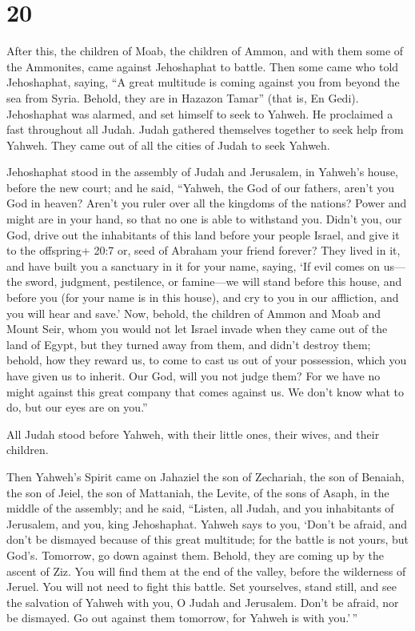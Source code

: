 \hypertarget{section-19}{%
\section{20}\label{section-19}}

 After this, the children of Moab, the children of Ammon,
and with them some of the Ammonites, came against Jehoshaphat to battle.
 Then some came who told Jehoshaphat, saying, ``A great
multitude is coming against you from beyond the sea from Syria. Behold,
they are in Hazazon Tamar'' (that is, En Gedi).  Jehoshaphat
was alarmed, and set himself to seek to Yahweh. He proclaimed a fast
throughout all Judah.  Judah gathered themselves together to
seek help from Yahweh. They came out of all the cities of Judah to seek
Yahweh.

 Jehoshaphat stood in the assembly of Judah and Jerusalem,
in Yahweh's house, before the new court;  and he said,
``Yahweh, the God of our fathers, aren't you God in heaven? Aren't you
ruler over all the kingdoms of the nations? Power and might are in your
hand, so that no one is able to withstand you.  Didn't you,
our God, drive out the inhabitants of this land before your people
Israel, and give it to the offspring+ 20:7 or, seed of Abraham your
friend forever?  They lived in it, and have built you a
sanctuary in it for your name, saying,  `If evil comes on
us---the sword, judgment, pestilence, or famine---we will stand before
this house, and before you (for your name is in this house), and cry to
you in our affliction, and you will hear and save.'  Now,
behold, the children of Ammon and Moab and Mount Seir, whom you would
not let Israel invade when they came out of the land of Egypt, but they
turned away from them, and didn't destroy them;  behold,
how they reward us, to come to cast us out of your possession, which you
have given us to inherit.  Our God, will you not judge
them? For we have no might against this great company that comes against
us. We don't know what to do, but our eyes are on you.''

 All Judah stood before Yahweh, with their little ones,
their wives, and their children.

 Then Yahweh's Spirit came on Jahaziel the son of
Zechariah, the son of Benaiah, the son of Jeiel, the son of Mattaniah,
the Levite, of the sons of Asaph, in the middle of the assembly;
 and he said, ``Listen, all Judah, and you inhabitants of
Jerusalem, and you, king Jehoshaphat. Yahweh says to you, `Don't be
afraid, and don't be dismayed because of this great multitude; for the
battle is not yours, but God's.  Tomorrow, go down against
them. Behold, they are coming up by the ascent of Ziz. You will find
them at the end of the valley, before the wilderness of Jeruel.
 You will not need to fight this battle. Set yourselves,
stand still, and see the salvation of Yahweh with you, O Judah and
Jerusalem. Don't be afraid, nor be dismayed. Go out against them
tomorrow, for Yahweh is with you.'\,''

